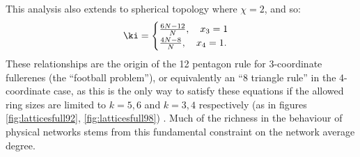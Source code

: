 This analysis also extends to spherical topology where $\chi=2$, and so:
 \begin{equation}
 	\label{eq:2dsphericalcases}
	\ki = \begin{cases}
		\frac{6N-12}{N}, \quad x_3 = 1 \\
		\frac{4N-8}{N}, \quad x_4 = 1.
	\end{cases}
\end{equation}
These relationships are the origin of the 12 pentagon rule for 3-coordinate fullerenes (the ``football problem''), or equivalently an ``8 triangle rule'' in the 4-coordinate case, as this is the only way to satisfy these equations if the allowed ring sizes are limited to $k=5,6$ and $k=3,4$ respectively (as in figures \ref{fig:latticesfull92}, \ref{fig:latticesfull98}) \cite{Fowler1996}.
Much of the richness in the behaviour of \td{} physical networks stems from this fundamental constraint on the network average degree.

